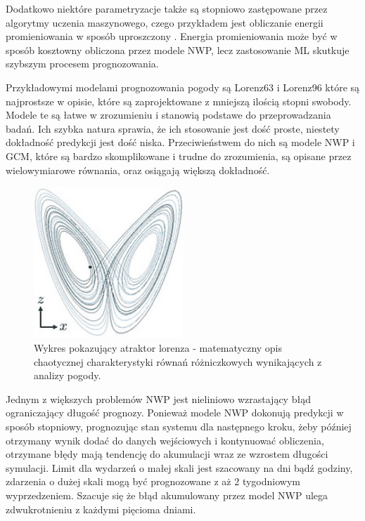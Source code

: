 Dodatkowo niektóre parametryzacje także są stopniowo zastępowane przez algorytmy uczenia maszynowego,
czego przykładem jest obliczanie energii promieniowania w sposób uproszczony
\cite{ai-in-weather-and-climate-prediction}. Energia promieniowania
może być w sposób kosztowny obliczona przez modele NWP, lecz zastosowanie ML skutkuje szybszym
procesem prognozowania.

Przykładowymi modelami prognozowania pogody są Lorenz63 i Lorenz96\cite{ai-in-weather-and-climate-prediction}
które są najprostsze w opisie,
które są zaprojektowane z mniejszą ilością stopni swobody. Modele te są łatwe w zrozumieniu i 
stanowią podstawe do przeprowadzania badań. Ich szybka natura sprawia, że ich stosowanie jest dość
proste, niestety dokładność predykcji jest dość niska. Przeciwieństwem do nich są modele NWP i GCM,
które są bardzo skomplikowane i trudne do zrozumienia, są opisane przez wielowymiarowe równania, oraz
osiągają większą dokładność.

\begin{figure}[H]
    \centering
    \includegraphics[width=0.5\textwidth]{images/lorenz.jpeg}
    \caption{Wykres pokazujący atraktor lorenza - matematyczny opis chaotycznej 
    charakterystyki równań różniczkowych wynikających z analizy pogody.}
    \label{lorenz}
\end{figure}

Jednym z większych problemów NWP jest nieliniowo wzrastający błąd ograniczający długość prognozy.
Ponieważ modele NWP dokonują predykcji w sposób stopniowy, prognozując stan systemu dla następnego
kroku, żeby później otrzymany wynik dodać do danych wejściowych i kontynuować obliczenia, otrzymane błędy
mają tendencję do akumulacji wraz ze wzrostem długości symulacji.
Limit dla wydarzeń o małej skali jest szacowany na dni bądź godziny, zdarzenia o dużej skali
mogą być prognozowane z aż 2 tygodniowym wyprzedzeniem. Szacuje się że błąd akumulowany przez 
model NWP ulega zdwukrotnieniu z każdymi pięcioma dniami.

